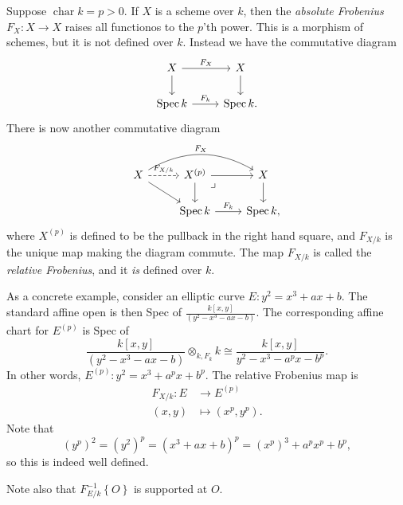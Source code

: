 \begin{example}
  Suppose \( \operatorname{char} k = p>0 \).
  If \( X \) is a scheme over \( k \), then the \textit{absolute Frobenius} \( F_X \colon X \to X \) raises all functionos to the \( p \)'th power. This is a morphism of schemes, but it is not defined over \( k \). Instead we have the commutative diagram
  \[
\begin{tikzcd}
  X \arrow[r,"F_X"] \arrow[d] & X \arrow[d] \\
  \operatorname{Spec} k \arrow[r,"F_k"] & \operatorname{Spec} k .
\end{tikzcd}
\]
There is now another commutative diagram
\[
\begin{tikzcd}
  X \arrow[rr,bend left,"F_X"] \arrow[dr] \arrow[r,dashed,"F_{X/k}"] & X^{(p)} \arrow[r] \arrow[d] \arrow[dr,phantom,"{\lrcorner}",very near start] & X \arrow[d] \\
  & \operatorname{Spec} k \arrow[r,"F_k"] & \operatorname{Spec} k ,
\end{tikzcd}
\]
where \( X^{(p)} \) is defined to be the pullback in the right hand square, and \( F_{X/k} \) is the unique map making the diagram commute.
The map \( F_{X/k} \) is called the \textit{relative Frobenius}, and it \textit{is} defined over \( k \).

As a concrete example, consider an elliptic curve \( E : y^2 = x^3 + ax + b \).
The standard affine open is then Spec of \( \frac{k[x,y]}{(y^2 - x^3 - ax -b)} \).
The corresponding affine chart for \( E^{(p)} \) is Spec of
\[ \frac{k[x,y]}{(y^2-x^3-ax-b)} \otimes_{k,F_k} k \cong \frac{k[x,y]}{y^2 - x^3 - a^p x - b^p} .  \]
In other words, \( E^{(p)} : y^2 = x^3 + a^p x + b^p \).
The relative Frobenius map is
\begin{align*}
  F_{X/k} \colon E & \to E^{(p)} \\
  (x,y) & \mapsto (x^p,y^p) .
\end{align*}
Note that
\[ (y^p)^2 = (y^2)^p = (x^3+ax+b)^p = (x^p)^3 + a^p x^p + b^p , \]
so this is indeed well defined.

Note also that \( F_{E/k}^{-1} \left\lbrace O \right\rbrace \) is supported at \( O \).


\end{example}
